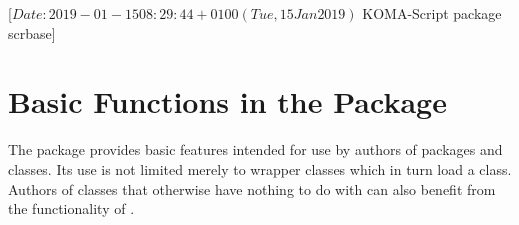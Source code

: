 %
%
%
%
%
%
%
%
% 
%
%
%
%

                 [$Date: 2019-01-15 08:29:44 +0100 (Tue, 15 Jan 2019) $
                  KOMA-Script package scrbase]


\chapter{Basic Functions in the  Package}
\BeginIndexGroup
{}%

The  package provides basic features intended for use by
authors of packages and classes. Its use is not limited merely to wrapper
classes which in turn load a \KOMAScript{} class. Authors of classes that
otherwise have nothing to do with \KOMAScript{} can also benefit from the
functionality of .


